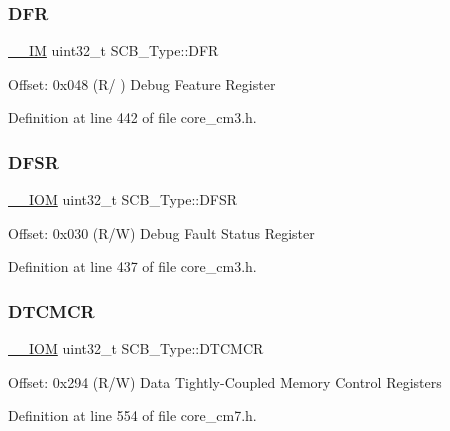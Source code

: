 \subsubsection{\texorpdfstring{D\+FR}{DFR}}
{\footnotesize\ttfamily \hyperlink{core__sc300_8h_a4cc1649793116d7c2d8afce7a4ffce43}{\+\_\+\+\_\+\+IM} uint32\+\_\+t S\+C\+B\+\_\+\+Type\+::\+D\+FR}

Offset\+: 0x048 (R/ ) Debug Feature Register 

Definition at line 442 of file core\+\_\+cm3.\+h.

\mbox{\label{struct_s_c_b___type_a191579bde0d21ff51d30a714fd887033}} 
\subsubsection{\texorpdfstring{D\+F\+SR}{DFSR}}
{\footnotesize\ttfamily \hyperlink{core__sc300_8h_ab6caba5853a60a17e8e04499b52bf691}{\+\_\+\+\_\+\+I\+OM} uint32\+\_\+t S\+C\+B\+\_\+\+Type\+::\+D\+F\+SR}

Offset\+: 0x030 (R/W) Debug Fault Status Register 

Definition at line 437 of file core\+\_\+cm3.\+h.

\mbox{\label{struct_s_c_b___type_a2836e932734240076ce91cf4484cdf43}} 
\subsubsection{\texorpdfstring{D\+T\+C\+M\+CR}{DTCMCR}}
{\footnotesize\ttfamily \hyperlink{core__sc300_8h_ab6caba5853a60a17e8e04499b52bf691}{\+\_\+\+\_\+\+I\+OM} uint32\+\_\+t S\+C\+B\+\_\+\+Type\+::\+D\+T\+C\+M\+CR}

Offset\+: 0x294 (R/W) Data Tightly-\/\+Coupled Memory Control Registers 

Definition at line 554 of file core\+\_\+cm7.\+h.

\mbox{\label{struct_s_c_b___type_a14ad254659362b9752c69afe3fd80934}} 
